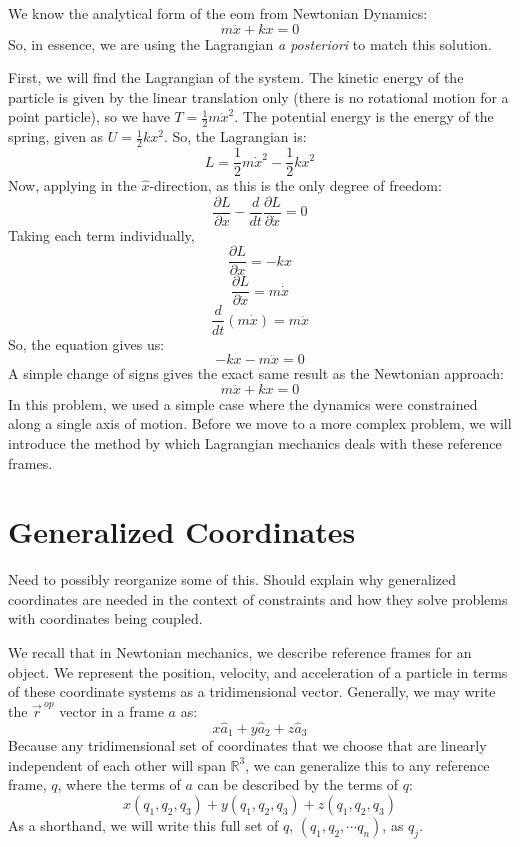 We know the analytical form of the \gls{eom} from Newtonian Dynamics:
$$m\ddot{x}+kx=0$$
So, in essence, we are using the \gls{Lagrangian} \textit{a posteriori} to match this solution.

First, we will find the \gls{Lagrangian} of the system. The kinetic energy of the particle is given by the linear translation only (there is no rotational motion for a point particle), so we have $T=\frac{1}{2}m\dot{x}^2$. The potential energy is the energy of the spring, given as $U=\frac{1}{2}kx^2$. So, the \gls{Lagrangian} is:
$$L=\frac{1}{2}m\dot{x}^2-\frac{1}{2}kx^2$$
Now, applying  in the $\hat{x}$-direction, as this is the only degree of freedom:
$$\frac{\partial L}{\partial x}-\frac{d}{dt}\frac{\partial L}{\partial \dot{x}}=0$$
Taking each term individually,
$$\frac{\partial L}{\partial x}=-kx$$
$$\frac{\partial L}{\partial \dot{x}}=m\dot{x}$$
$$\frac{d}{dt}\left(m\dot{x}\right)=m\ddot{x}$$
So, the  equation gives us:
$$-kx-m\ddot{x}=0$$
A simple change of signs gives the exact same result as the Newtonian approach:
$$m\ddot{x}+kx=0$$
In this problem, we used a simple case where the dynamics were constrained along a single axis of motion. Before we move to a more complex problem, we will introduce the method by which \gls{Lagrangian} mechanics deals with these reference frames.
\section{Generalized Coordinates}
\color{red} Need to possibly reorganize some of this. Should explain why generalized coordinates are needed in the context of constraints and how they solve problems with coordinates being coupled.

\color{black}

We recall that in Newtonian mechanics, we describe reference frames for an object. We represent the position, velocity, and acceleration of a particle in terms of these coordinate systems as a tridimensional vector. 
Generally, we may write the $\vec{r}^{\ op}$  vector in a frame $a$ as:
$$x\hat{a}_1+y\hat{a}_2+z\hat{a}_3$$
Because any tridimensional set of coordinates that we choose that are linearly independent of each other will span $\mathbb{R}^3$, we can generalize this to any reference frame, $q$, where the terms of $a$ can be described by the terms of $q$:
$$x\left(q_1,q_2,q_3\right)+y\left(q_1,q_2,q_3\right)+z\left(q_1,q_2,q_3\right)$$
As a shorthand, we will write this full set of $q$, $\left(q_1,q_2,\cdots q_n\right)$, as $q_j$.

